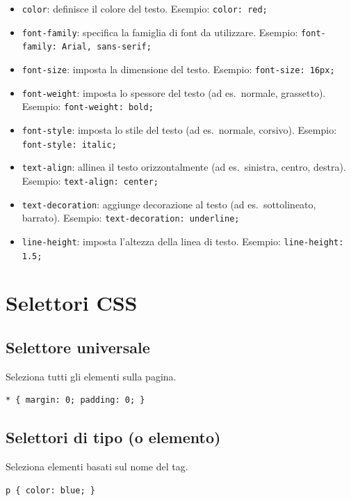 \begin{itemize}
    \item \texttt{color}: definisce il colore del testo. Esempio: \texttt{color: red;}
    \item \texttt{font-family}: specifica la famiglia di font da utilizzare. Esempio: \texttt{font-family: Arial, sans-serif;}
    \item \texttt{font-size}: imposta la dimensione del testo. Esempio: \texttt{font-size: 16px;}
    \item \texttt{font-weight}: imposta lo spessore del testo (ad es.\ normale, grassetto). Esempio: \texttt{font-weight: bold;}
    \item \texttt{font-style}: imposta lo stile del testo (ad es.\ normale, corsivo). Esempio: \texttt{font-style: italic;}
    \item \texttt{text-align}: allinea il testo orizzontalmente (ad es.\ sinistra, centro, destra). Esempio: \texttt{text-align: center;}
    \item \texttt{text-decoration}: aggiunge decorazione al testo (ad es.\ sottolineato, barrato). Esempio: \texttt{text-decoration: underline;}
    \item \texttt{line-height}: imposta l'altezza della linea di testo. Esempio: \texttt{line-height: 1.5;}
\end{itemize}

\section{Selettori CSS}

\subsection{Selettore universale}

Seleziona tutti gli elementi sulla pagina.

\begin{lstlisting}[caption=Selettore universale]
* { margin: 0; padding: 0; }
\end{lstlisting}

\subsection{Selettori di tipo (o elemento)}

Seleziona elementi basati sul nome del tag.

\begin{lstlisting}[caption=Selettore di tipo]
p { color: blue; }
\end{lstlisting}

